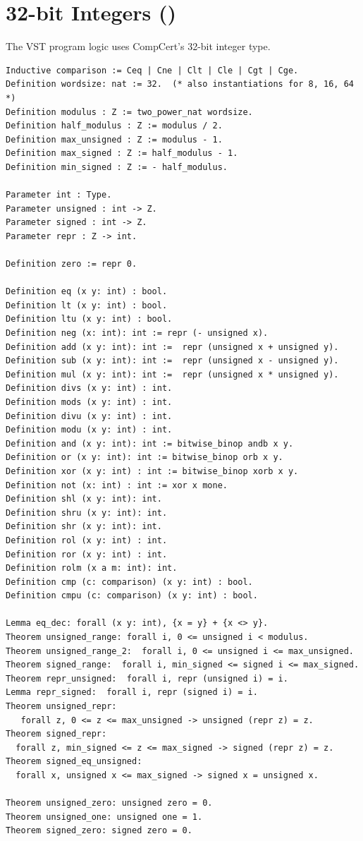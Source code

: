 \documentclass[12pt,fleqn,openany,oneside,showtrims]{memoir}
\newcommand{\ychapter}[2]{\chapter[#1]{#1 \hfill \normalsize #2}}
\begin{document}
\ychapter{32-bit Integers}{()}

The VST program logic uses CompCert's 32-bit integer type.

\begin{lstlisting}
Inductive comparison := Ceq | Cne | Clt | Cle | Cgt | Cge.
Definition wordsize: nat := 32.  (* also instantiations for 8, 16, 64 *)
Definition modulus : Z := two_power_nat wordsize.
Definition half_modulus : Z := modulus / 2.
Definition max_unsigned : Z := modulus - 1.
Definition max_signed : Z := half_modulus - 1.
Definition min_signed : Z := - half_modulus.

Parameter int : Type.
Parameter unsigned : int -> Z.
Parameter signed : int -> Z.
Parameter repr : Z -> int.

Definition zero := repr 0.

Definition eq (x y: int) : bool.
Definition lt (x y: int) : bool.
Definition ltu (x y: int) : bool.
Definition neg (x: int): int := repr (- unsigned x).
Definition add (x y: int): int :=  repr (unsigned x + unsigned y).
Definition sub (x y: int): int :=  repr (unsigned x - unsigned y).
Definition mul (x y: int): int :=  repr (unsigned x * unsigned y).
Definition divs (x y: int) : int.
Definition mods (x y: int) : int.
Definition divu (x y: int) : int.
Definition modu (x y: int) : int.
Definition and (x y: int): int := bitwise_binop andb x y.
Definition or (x y: int): int := bitwise_binop orb x y.
Definition xor (x y: int) : int := bitwise_binop xorb x y.
Definition not (x: int) : int := xor x mone.
Definition shl (x y: int): int.
Definition shru (x y: int): int.
Definition shr (x y: int): int.
Definition rol (x y: int) : int.
Definition ror (x y: int) : int.
Definition rolm (x a m: int): int.
Definition cmp (c: comparison) (x y: int) : bool.
Definition cmpu (c: comparison) (x y: int) : bool.

Lemma eq_dec: forall (x y: int), {x = y} + {x <> y}.
Theorem unsigned_range: forall i, 0 <= unsigned i < modulus.
Theorem unsigned_range_2:  forall i, 0 <= unsigned i <= max_unsigned.
Theorem signed_range:  forall i, min_signed <= signed i <= max_signed.
Theorem repr_unsigned:  forall i, repr (unsigned i) = i.
Lemma repr_signed:  forall i, repr (signed i) = i.
Theorem unsigned_repr: 
   forall z, 0 <= z <= max_unsigned -> unsigned (repr z) = z.
Theorem signed_repr:
  forall z, min_signed <= z <= max_signed -> signed (repr z) = z.
Theorem signed_eq_unsigned:
  forall x, unsigned x <= max_signed -> signed x = unsigned x.

Theorem unsigned_zero: unsigned zero = 0.
Theorem unsigned_one: unsigned one = 1.
Theorem signed_zero: signed zero = 0.


\end{lstlisting}
\end{document}
